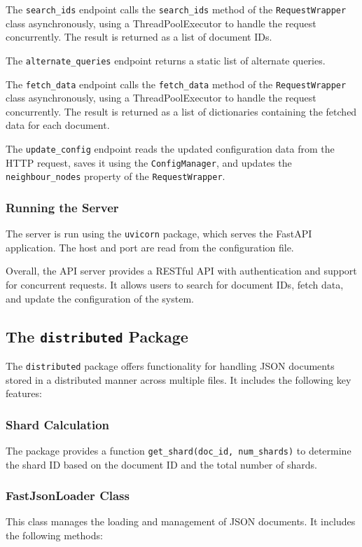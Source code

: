 \documentclass{article}
\begin{document}
The \texttt{search\_ids} endpoint calls the \texttt{search\_ids} method of the \texttt{RequestWrapper} class asynchronously, using a ThreadPoolExecutor to handle the request concurrently. The result is returned as a list of document IDs.

The \texttt{alternate\_queries} endpoint returns a static list of alternate queries.

The \texttt{fetch\_data} endpoint calls the \texttt{fetch\_data} method of the \texttt{RequestWrapper} class asynchronously, using a ThreadPoolExecutor to handle the request concurrently. The result is returned as a list of dictionaries containing the fetched data for each document.

The \texttt{update\_config} endpoint reads the updated configuration data from the HTTP request, saves it using the \texttt{ConfigManager}, and updates the \texttt{neighbour\_nodes} property of the \texttt{RequestWrapper}.

\subsubsection{Running the Server}

The server is run using the \texttt{uvicorn} package, which serves the FastAPI application. The host and port are read from the configuration file.

Overall, the API server provides a RESTful API with authentication and support for concurrent requests. It allows users to search for document IDs, fetch data, and update the configuration of the system.

\subsection{The \texttt{distributed} Package}

The \texttt{distributed} package offers functionality for handling JSON documents stored in a distributed manner across multiple files. It includes the following key features:

\subsubsection{Shard Calculation}
The package provides a function \texttt{get\_shard(doc\_id, num\_shards)} to determine the shard ID based on the document ID and the total number of shards.

\subsubsection{FastJsonLoader Class}
This class manages the loading and management of JSON documents. It includes the following methods:
\end{document}
